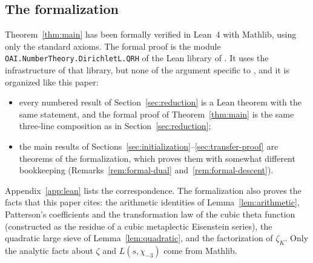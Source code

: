 \subsection{The formalization}\label{sec:formal}
Theorem~\ref{thm:main} has been formally verified in Lean~4 with Mathlib, using only the
standard axioms. The formal proof is the module \texttt{OAI.NumberTheory.\allowbreak DirichletL.\allowbreak QRH} of the
Lean library of \cite{OpenAI26}. It uses the infrastructure of that library, but none of the
argument specific to \cite{OpenAI26}, and it is organized like this paper:
\begin{itemize}
\item every numbered result of Section~\ref{sec:reduction} is a Lean theorem with the same
statement, and the formal proof of Theorem~\ref{thm:main} is the same three-line composition as
in Section~\ref{sec:reduction};
\item the main results of Sections~\ref{sec:initialization}--\ref{sec:transfer-proof} are
theorems of the formalization, which proves them with somewhat different bookkeeping
(Remarks~\ref{rem:formal-dual} and~\ref{rem:formal-descent}).
\end{itemize}
Appendix~\ref{app:lean} lists the correspondence. The formalization also proves the facts that
this paper cites: the arithmetic identities of Lemma~\ref{lem:arithmetic}, Patterson's
coefficients and the transformation law of the cubic theta function (constructed as the residue
of a cubic metaplectic Eisenstein series), the quadratic large sieve of Lemma~\ref{lem:quadratic},
and the factorization of $\zeta_K$. Only the analytic facts about $\zeta$ and $L(s,\chi_{-3})$
come from Mathlib.

